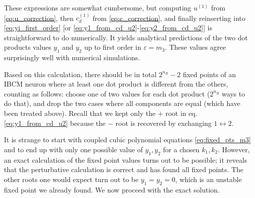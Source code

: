 These expressions are somewhat cumbersome, but computing $u^{(1)}$ from \eqref{eq:u_correction}, then $c_d^{(1)}$ from \eqref{eq:c_correction}, and finally reinserting into \eqref{eq:yi_first_order} [or \eqref{eq:y1_from_cd_u2}-\eqref{eq:y2_from_cd_u2}] is straightforward to do numerically. It yields analytical predictions of the two dot products values $y_1$ and $y_2$ up to first order in $\varepsilon = m_3$. These values agree surprisingly well with numerical simulations. 

Based on this calculation, there should be in total $2^{n_B} - 2$ fixed points of an IBCM neuron where at least one dot product is different from the others, counting as follows: choose one of two values for each dot product ($2^{n_B}$ ways to do that), and drop the two cases where all components are equal (which have been treated above). Recall that we kept only the $+$ root in eq. \eqref{eq:y1_from_cd_u2} because the $-$ root is recovered by exchanging $1 \leftrightarrow 2$. 

It is strange to start with coupled cubic polynomial equations \eqref{eq:fixed_pts_m3} and to end up with only one possible value of $y_1, y_2$ for a chosen $k_1, k_2$. 
However, an exact calculation of the fixed point values turns out to be possible; it reveals that the perturbative calculation is correct and has found all fixed points. The other roots one would expect turn out to be $y_1=y_2=0$, which is an unstable fixed point we already found. We now proceed with the exact solution. 


